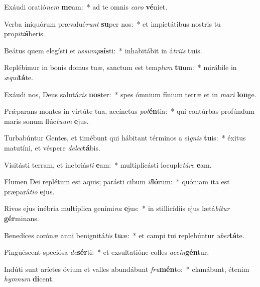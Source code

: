 \item Exáudi oratió\textit{nem} \textbf{me}am:~* ad te omnis \textit{ca}\textit{ro} \textbf{vé}niet.
\item Verba iniquórum prævalué\textit{runt} \textbf{su}per nos:~* et impietátibus nostris tu pro\textit{pi}\textit{ti}\textbf{á}beris.
\item Beátus quem elegísti et as\textit{sump}\textbf{sís}ti:~* inhabitábit in á\textit{tri}\textit{is} \textbf{tu}is.
\item Replébimur in bonis domus tuæ, sanctum est tem\textit{plum} \textbf{tu}um:~* mirábile in \textit{æ}\textit{qui}\textbf{tá}te.
\item Exáudi nos, Deus salutá\textit{ris} \textbf{nos}ter:~* spes ómnium fínium terræ et in \textit{ma}\textit{ri} \textbf{lon}ge.
\item Prǽparans montes in virtúte tua, accínctus \textit{pot}\textbf{én}tia:~* qui contúrbas profúndum maris sonum flúc\textit{tu}\textit{um} \textbf{e}jus.
\item Turbabúntur Gentes, et timébunt qui hábitant términos a si\textit{gnis} \textbf{tu}is:~* éxitus matutíni, et véspere \textit{de}\textit{lec}\textbf{tá}bis.
\item Visitásti terram, et inebriás\textit{ti} \textbf{e}am:~* multiplicásti locuple\textit{tá}\textit{re} \textbf{e}am.
\item Flumen Dei replétum est aquis; parásti cibum \textit{il}\textbf{ló}rum:~* quóniam ita est præpará\textit{ti}\textit{o} \textbf{e}jus.
\item Rivos ejus inébria multíplica geními\textit{na} \textbf{e}jus:~* in stillicídiis ejus lætá\textit{bi}\textit{tur} \textbf{gér}minans.
\item Benedíces corónæ anni benignitá\textit{tis} \textbf{tu}æ:~* et campi tui replebúntur \textit{u}\textit{ber}\textbf{tá}te.
\item Pinguéscent speciósa \textit{de}\textbf{sér}ti:~* et exsultatióne colles \textit{ac}\textit{cin}\textbf{gén}tur.
\item Indúti sunt aríetes óvium et valles abundábunt \textit{fru}\textbf{mén}to:~* clamábunt, étenim \textit{hym}\textit{num} \textbf{di}cent.
